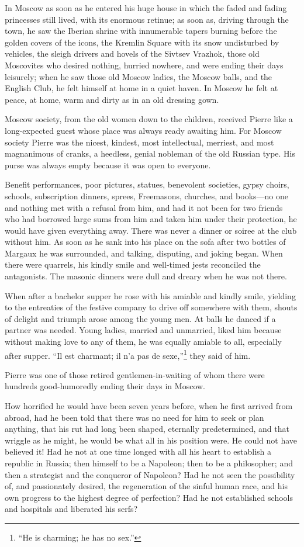 In Moscow as soon as he entered his huge house in which the faded
and fading princesses still lived, with its enormous retinue; as
soon as, driving through the town, he saw the Iberian shrine with
innumerable tapers burning before the golden covers of the icons,
the Kremlin Square with its snow undisturbed by vehicles, the
sleigh drivers and hovels of the Sivtsev Vrazhok, those old
Moscovites who desired nothing, hurried nowhere, and were ending
their days leisurely; when he saw those old Moscow ladies, the
Moscow balls, and the English Club, he felt himself at home in a
quiet haven. In Moscow he felt at peace, at home, warm and dirty
as in an old dressing gown.

Moscow society, from the old women down to the children, received
Pierre like a long-expected guest whose place was always ready
awaiting him.  For Moscow society Pierre was the nicest, kindest,
most intellectual, merriest, and most magnanimous of cranks, a
heedless, genial nobleman of the old Russian type. His purse was
always empty because it was open to everyone.

Benefit performances, poor pictures, statues, benevolent
societies, gypsy choirs, schools, subscription dinners, sprees,
Freemasons, churches, and books---no one and nothing met with a
refusal from him, and had it not been for two friends who had
borrowed large sums from him and taken him under their
protection, he would have given everything away.  There was never
a dinner or soiree at the club without him. As soon as he sank
into his place on the sofa after two bottles of Margaux he was
surrounded, and talking, disputing, and joking began. When there
were quarrels, his kindly smile and well-timed jests reconciled
the antagonists. The masonic dinners were dull and dreary when he
was not there.

When after a bachelor supper he rose with his amiable and kindly
smile, yielding to the entreaties of the festive company to drive
off somewhere with them, shouts of delight and triumph arose
among the young men. At balls he danced if a partner was
needed. Young ladies, married and unmarried, liked him because
without making love to any of them, he was equally amiable to
all, especially after supper. ``Il est charmant; il n'a pas de
sexe,''\footnote{``He is charming; he has no sex.''} they said of
him.

Pierre was one of those retired gentlemen-in-waiting of whom
there were hundreds good-humoredly ending their days in Moscow.

How horrified he would have been seven years before, when he
first arrived from abroad, had he been told that there was no
need for him to seek or plan anything, that his rut had long been
shaped, eternally predetermined, and that wriggle as he might, he
would be what all in his position were. He could not have
believed it! Had he not at one time longed with all his heart to
establish a republic in Russia; then himself to be a Napoleon;
then to be a philosopher; and then a strategist and the conqueror
of Napoleon? Had he not seen the possibility of, and passionately
desired, the regeneration of the sinful human race, and his own
progress to the highest degree of perfection?  Had he not
established schools and hospitals and liberated his serfs?

